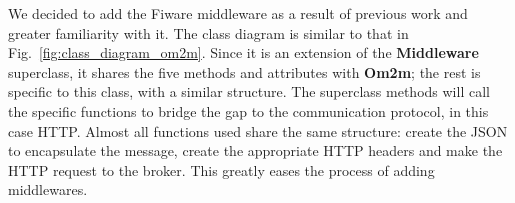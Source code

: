 \documentclass[conference]{IEEEtran}
\begin{document}
We decided to add the Fiware middleware as a result of previous work and greater familiarity with it. The class diagram is similar to that in Fig.~\ref{fig:class_diagram_om2m}. Since it is an extension of the \textbf{Middleware} superclass, it shares the five methods and attributes with \textbf{Om2m}; the rest is specific to this class, with a similar structure. The superclass methods will call the specific functions to bridge the gap to the communication protocol, in this case HTTP\@.
% 
% 
% 
% 
Almost all functions used share the same structure: create the JSON to encapsulate the message, create the appropriate HTTP headers and make the HTTP request to the broker. This greatly eases the process of adding middlewares.
\end{document}

